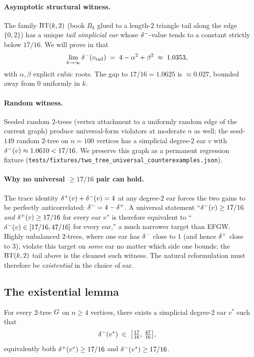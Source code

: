 \paragraph{Asymptotic structural witness.} The family $\mathrm{BT}(k,2)$
(book $B_{k}$ glued to a length-$2$ triangle tail along the edge
$\{0, 2\}$) has a unique \emph{tail simplicial ear} whose
$\delta^{-}$-value tends to a constant strictly below $17/16$. We will
prove in  that
\[
\lim_{k \to \infty} \delta^{-}(v_{\mathrm{tail}}) \;=\;
4 - \alpha^{2} + \beta^{2} \;\approx\; 1.0353,
\]
with $\alpha, \beta$ explicit cubic roots. The gap to $17/16 = 1.0625$
is $\approx 0.027$, bounded away from $0$ uniformly in $k$.

\paragraph{Random witness.} Seeded random $2$-trees (vertex attachment
to a uniformly random edge of the current graph) produce universal-form
violators at moderate $n$ as well; the seed-$149$ random $2$-tree on
$n = 100$ vertices has a simplicial degree-$2$ ear $v$ with
$\delta^{-}(v) \approx 1.0610 < 17/16$. We preserve this graph as a
permanent regression fixture
(\texttt{tests/fixtures/two\_tree\_universal\_counterexamples.json}).

\paragraph{Why no universal $\ge 17/16$ pair can hold.} The trace
identity $\delta^{+}(v) + \delta^{-}(v) = 4$ at any degree-$2$ ear forces the
two gains to be perfectly anticorrelated: $\delta^{-} = 4 - \delta^{+}$. A
universal statement ``$\delta^{-}(v) \ge 17/16$ \emph{and}
$\delta^{+}(v) \ge 17/16$ for every ear $v$'' is therefore equivalent to
``$\delta^{-}(v) \in [17/16, 47/16]$ for every ear,'' a much narrower
target than EFGW. Highly unbalanced $2$-trees, where one ear has
$\delta^{-}$ close to $1$ (and hence $\delta^{+}$ close to $3$), violate this
target on \emph{some} ear no matter which side one bounds; the
$\mathrm{BT}(k,2)$ tail above is the cleanest such witness. The natural
reformulation must therefore be \emph{existential} in the choice of
ear.

\subsection{The existential lemma}\label{sec:lprime:existential}

\begin{conjecture}\label{thm:Lprime}
For every $2$-tree $G$ on $n \ge 4$ vertices, there exists a
simplicial degree-$2$ ear $v^{*}$ such that
\[
\delta^{-}(v^{*}) \;\in\; \bigl[\tfrac{17}{16},\, \tfrac{47}{16}\bigr],
\]
equivalently both $\delta^{+}(v^{*}) \ge 17/16$ and $\delta^{-}(v^{*}) \ge 17/16$.
\end{conjecture}

